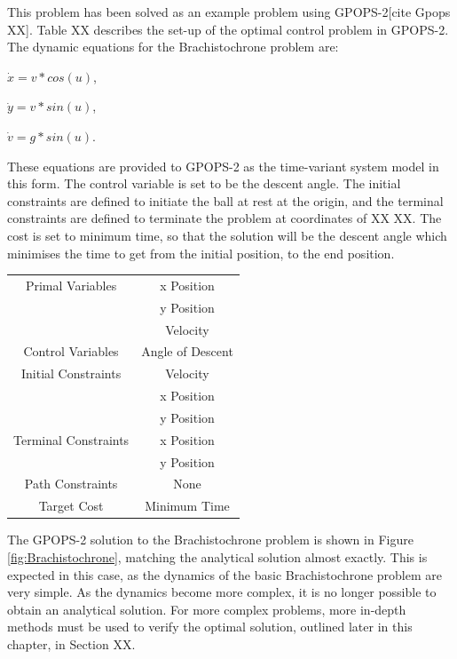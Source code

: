 This problem has been solved as an example problem using GPOPS-2[cite Gpops XX]. Table XX describes the set-up of the optimal control problem in GPOPS-2. The dynamic equations for the Brachistochrone problem are:

$\dot{x} = v*cos(u)$,

$\dot{y} = v*sin(u)$,

$\dot{v} = g*sin(u)$.

\noindent These equations are provided to GPOPS-2 as the time-variant system model in this form. The control variable is set to be the descent angle. The initial constraints are defined to initiate the ball at rest at the origin, and the terminal constraints are defined to terminate the problem at coordinates of XX XX. The cost is set to minimum time, so that the solution will be the descent angle which minimises the time to get from the initial position, to the end position. 

\begin{table}
\centering
\begin{tabular}{|c|c|}
	\hline Primal Variables  & x Position\\& y Position\\& Velocity\\ 
	\hline Control Variables  & Angle of Descent\\ 
	\hline Initial Constraints  & Velocity\\ & x Position\\ & y Position\\
	\hline Terminal Constraints &  x Position\\ & y Position\\
	\hline Path Constraints & None \\ 
	\hline Target Cost & Minimum Time \\ 
	\hline 
\end{tabular} 
\end{table}


The GPOPS-2 solution to the Brachistochrone problem is shown in Figure \ref{fig:Brachistochrone}, matching the analytical solution almost exactly. This is expected in this case, as the dynamics of the basic Brachistochrone problem are very simple. As the dynamics become more complex, it is no longer possible to obtain an analytical solution. For more complex problems, more in-depth methods must be used to verify the optimal solution, outlined later in this chapter, in Section XX.  

